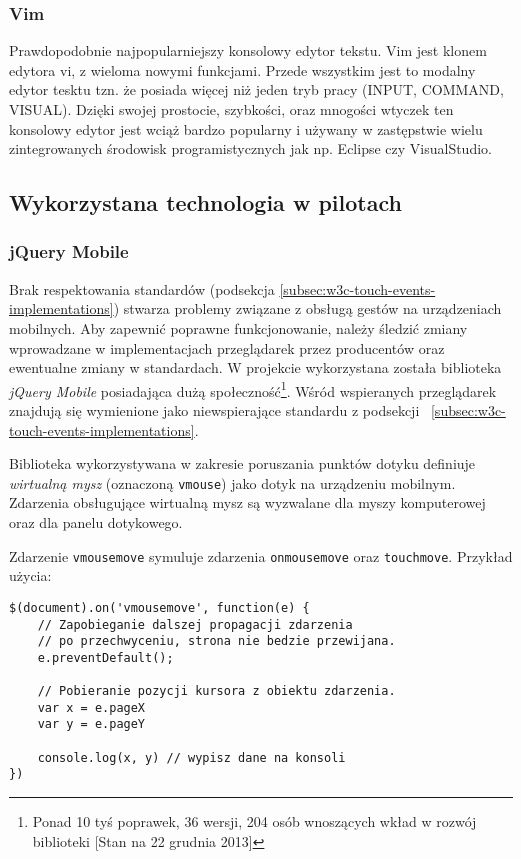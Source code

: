 \subsubsection{Vim}
\label{sub:Vim}
Prawdopodobnie najpopularniejszy konsolowy edytor tekstu. Vim jest klonem edytora vi, z wieloma nowymi funkcjami. Przede wszystkim jest to modalny edytor tesktu tzn. że posiada więcej niż jeden tryb pracy (INPUT, COMMAND, VISUAL). Dzięki swojej prostocie, szybkości, oraz mnogości wtyczek ten konsolowy edytor jest wciąż bardzo popularny i używany w zastępstwie wielu zintegrowanych środowisk programistycznych jak np. Eclipse czy VisualStudio.  

\subsection{Wykorzystana technologia w pilotach}

\subsubsection{jQuery Mobile}
\label{subsub:tool-jquery-mobile}

Brak respektowania standardów (podsekcja \ref{subsec:w3c-touch-events-implementations}) stwarza problemy związane z obsługą gestów na urządzeniach mobilnych. Aby zapewnić poprawne funkcjonowanie, należy śledzić zmiany wprowadzane w implementacjach przeglądarek przez producentów oraz ewentualne zmiany w standardach. W projekcie wykorzystana została biblioteka \emph{jQuery Mobile} posiadająca dużą społeczność\footnote{Ponad 10 tyś poprawek, 36 wersji, 204 osób wnoszących wkład w rozwój biblioteki [Stan na 22 grudnia 2013]}. Wśród wspieranych przeglądarek znajdują się wymienione jako niewspierające standardu z podsekcji ~\ref{subsec:w3c-touch-events-implementations}.

Biblioteka wykorzystywana w zakresie poruszania punktów dotyku definiuje \emph{wirtualną mysz} (oznaczoną \lstinline{vmouse}) jako dotyk na urządzeniu mobilnym. Zdarzenia obsługujące wirtualną mysz są wyzwalane dla myszy komputerowej oraz dla panelu dotykowego.

Zdarzenie \lstinline{vmousemove} symuluje zdarzenia \lstinline{onmousemove} oraz \lstinline{touchmove}. Przykład użycia:

\lstset{language=JavaScript}
\begin{lstlisting}
$(document).on('vmousemove', function(e) {
	// Zapobieganie dalszej propagacji zdarzenia
	// po przechwyceniu, strona nie bedzie przewijana.
	e.preventDefault();
	
	// Pobieranie pozycji kursora z obiektu zdarzenia.
	var x = e.pageX
	var y = e.pageY
	
	console.log(x, y) // wypisz dane na konsoli
})
\end{lstlisting}

